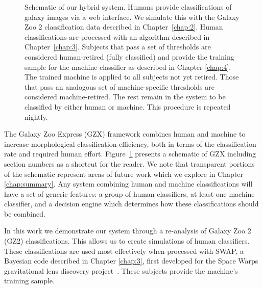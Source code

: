 \begin{figure}[ht!]
\caption[Schematic of the Galaxy Zoo: Express human+machine hybrid system.]{Schematic of our hybrid system. Humans provide classifications of galaxy images via a web interface. We simulate this with the Galaxy Zoo 2 classification data described in Chapter~\ref{chap:2}. Human classifications are processed with an algorithm described in Chapter~\ref{chap:3}. Subjects that pass a set of thresholds are considered human-retired (fully classified) and provide the training sample for the machine classifier as described in Chapter \ref{chap:4}. The trained machine is applied to all subjects not yet retired. Those that pass an analogous set of machine-specific thresholds are considered machine-retired. The rest remain in the system to be classified by either human or machine. This procedure is repeated  nightly. \label{fig: schematic}}
\end{figure}



The Galaxy Zoo Express (GZX) framework combines human and machine to increase morphological classification efficiency, both in terms of the classification rate and required human effort. Figure~\ref{fig: schematic} presents a schematic of GZX including section numbers as a shortcut for the reader. We note that transparent portions  of the schematic represent areas of future work which we explore in Chapter \ref{chap:summary}. Any system combining human and machine classifications will have a set of generic features: a group of human classifiers, at least one machine classifier, and a decision engine which determines how these classifications should be combined.

In this work we demonstrate our system through a re-analysis of  Galaxy Zoo 2 (GZ2) classifications. This allows us to  create simulations of human classifiers. These classifications are used most effectively when processed with SWAP, a Bayesian code described in Chapter \ref{chap:3}, first developed for the Space Warps gravitational lens discovery project~\citep{Marshall2016}. These subjects provide the machine's training sample. 

